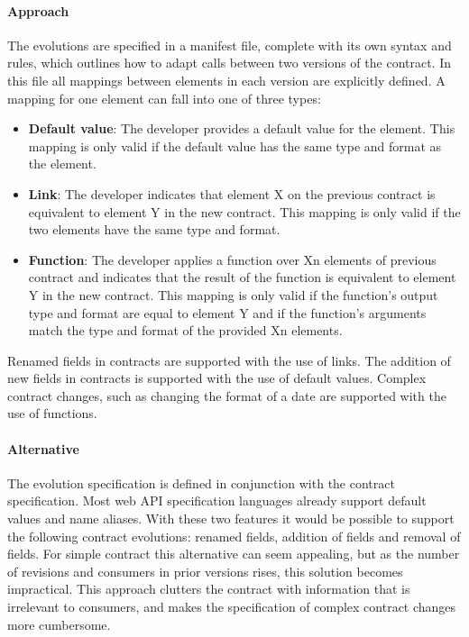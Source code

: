 \paragraph{Approach}
The evolutions are specified in a manifest file, complete with its own syntax and rules,
which outlines how to adapt calls between two versions of the contract.
In this file all mappings between elements in each version are explicitly defined.
A mapping for one element can fall into one of three types:
\begin{itemize}
    \item \textbf{Default value}: The developer provides a default value for the element.
    This mapping is only valid if the default value has the same type and format as the element.
    \item \textbf{Link}: The developer indicates that element X on the previous contract is equivalent to element Y in the new contract.
    This mapping is only valid if the two elements have the same type and format.
    \item \textbf{Function}: The developer applies a function over Xn elements of previous contract and indicates that the result of the function is equivalent to element Y in the new contract.
    This mapping is only valid if the function's output type and format are equal to element Y and if the function's arguments match the type and format of the provided Xn elements.
\end{itemize}
Renamed fields in contracts are supported with the use of links.
The addition of new fields in contracts is supported with the use of default values.
Complex contract changes, such as changing the format of a date are supported with the use of functions.

\paragraph{Alternative}
The evolution specification is defined in conjunction with the contract specification.
Most web API specification languages already support default values and name aliases.
With these two features it would be possible
to support the following contract evolutions: renamed fields, addition of fields and removal of fields.
For simple contract this alternative can seem appealing, but as the number of revisions and consumers in prior versions rises, this solution becomes impractical.
This approach clutters the contract with information that is irrelevant to consumers, and makes the specification of complex contract changes more cumbersome.

